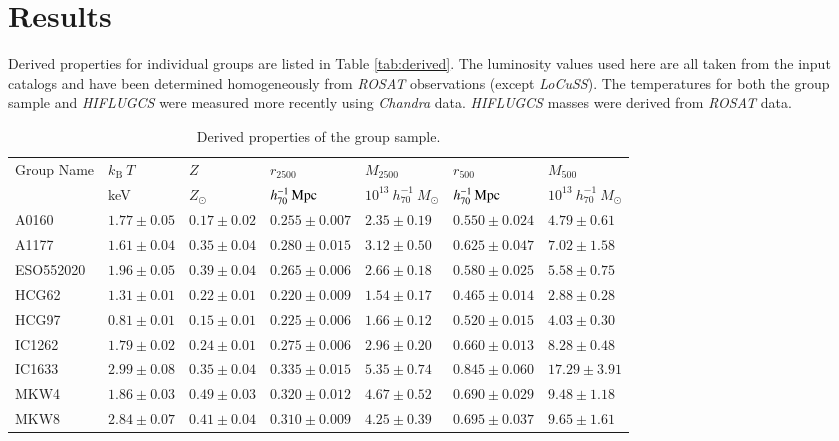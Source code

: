 \documentclass[structabstract]{aa}
\begin{document}
\section{Results}\label{sec:results}
%
Derived properties for individual groups are listed in Table
\ref{tab:derived}. The luminosity values used here are all taken from
the input catalogs and have been determined homogeneously from
\emph{ROSAT} observations (except \emph{LoCuSS}). The temperatures for
both the group sample and \emph{HIFLUGCS} were measured more recently
using \emph{Chandra} data. \emph{HIFLUGCS} masses were derived from
\emph{ROSAT} data.
\begin{table}
\begin{threeparttable}
\centering
\caption{Derived properties of the group sample.}
\setlength\extrarowheight{2pt}
\begin{tabularx}{\textwidth}{lYYYYYY}\hline\hline
Group Name & $k_{\text{B}}~T$ & $Z$ & $r_{2500}$ & $M_{2500}$ & $r_{500}$ & $M_{500}$ \\
 & keV & $Z_{\odot}$ & $\unit[h^{-1}_{70}]{Mpc}$ & $10^{13}~h^{-1}_{70}~M_{\odot}$ & $\unit[h^{-1}_{70}]{Mpc}$ & $10^{13}~h^{-1}_{70}~ M_{\odot}$ \\ \hline
A0160 & $1.77\pm0.05$ & $0.17\pm0.02$ & $0.255\pm0.007$ & $2.35\pm0.19$ & $0.550\pm0.024$ & $4.79\pm0.61$ \\ 
A1177 & $1.61\pm0.04$ & $0.35\pm0.04$ & $0.280\pm0.015$ & $3.12\pm0.50$ & $0.625\pm0.047$ & $7.02\pm1.58$ \\ 
ESO552020 & $1.96\pm0.05$ & $0.39\pm0.04$ & $0.265\pm0.006$ & $2.66\pm0.18$ & $0.580\pm0.025$ & $5.58\pm0.75$ \\ 
HCG62 & $1.31\pm0.01$ & $0.22\pm0.01$ & $0.220\pm0.009$ & $1.54\pm0.17$ & $0.465\pm0.014$ & $2.88\pm0.28$ \\ 
HCG97 & $0.81\pm0.01$ & $0.15\pm0.01$ & $0.225\pm0.006$ & $1.66\pm0.12$ & $0.520\pm0.015$ & $4.03\pm0.30$ \\ 
IC1262 & $1.79\pm0.02$ & $0.24\pm0.01$ & $0.275\pm0.006$ & $2.96\pm0.20$ & $0.660\pm0.013$ & $8.28\pm0.48$ \\ 
IC1633 & $2.99\pm0.08$ & $0.35\pm0.04$ & $0.335\pm0.015$ & $5.35\pm0.74$ & $0.845\pm0.060$ & $17.29\pm3.91$ \\ 
MKW4 & $1.86\pm0.03$ & $0.49\pm0.03$ & $0.320\pm0.012$ & $4.67\pm0.52$ & $0.690\pm0.029$ & $9.48\pm1.18$ \\ 
MKW8 & $2.84\pm0.07$ & $0.41\pm0.04$ & $0.310\pm0.009$ & $4.25\pm0.39$ & $0.695\pm0.037$ & $9.65\pm1.61$ \\ 

\end{tabularx}
\end{threeparttable}
\end{table}
\end{document}
